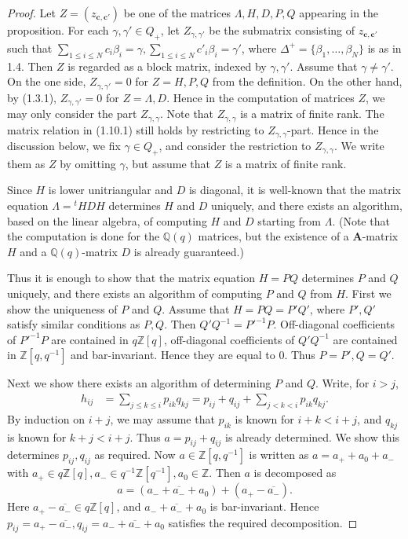 \documentclass[12pt]{amsart}
\renewcommand\b{\beta}
\newcommand\g{\gamma}
\newcommand\vD{\varDelta}
\newcommand\vL{\varLambda}
\renewcommand{\1}{\mathbb 1}
\newcommand{\QQ}{\mathbb Q}
\newcommand{\ZZ}{\mathbb Z}
\newcommand\BA{\mathbf A}
\newcommand\Bc{\mathbf c}
\newcommand\iv{^{-1}}
\newcommand\ol{\overline}
\numberwithin{equation}{section}
\begin{document}
\begin{proof}
Let $Z = (z_{\Bc,\Bc'})$ be one of the matrices $\vL, H, D, P, Q$
appearing in the proposition. For each $\g, \g' \in Q_+$,  let $Z_{\g, \g'}$
be the submatrix consisting of $z_{\Bc,\Bc'}$ such that
$\sum_{1 \le i \le N}c_i\b_i = \g, \sum_{1 \le i \le N}c'_i\b_i = \g'$,
where $\vD^+ = \{ \b_1, \dots, \b_N\}$ is as in 1.4. Then $Z$ is regarded as a block
matrix, indexed by $\g, \g'$.  Assume that $\g \ne \g'$.
On the one side, $Z_{\g,\g'} = 0$ for $Z = H, P, Q$ from the definition.
On the other hand, by (1.3.1), $Z_{\g, \g'} = 0$ for $Z = \vL, D$.
Hence in the computation of matrices $Z$, we may only consider the part $Z_{\g,\g}$. 
Note that $Z_{\g,\g}$ is a matrix of finite rank.
The matrix relation in (1.10.1) still holds by restricting to $Z_{\g,\g}$-part.
Hence in the discussion below, we fix $\g \in Q_+$, and consider the restriction
to $Z_{\g, \g}$.  We write them as $Z$ by omitting $\g$,
but assume that $Z$ is a matrix of finite rank. 
\par
Since $H$ is lower unitriangular and $D$ is diagonal, it is well-known that
the matrix equation $\vL = {}^tHDH$ determines $H$ and $D$ uniquely, and
there exists an algorithm,  based on the linear algebra,
of computing $H$ and $D$ starting from $\vL$. (Note that the computation is done
for the $\QQ(q)$ matrices, but the existence of a $\BA$-matrix $H$ and a $\QQ(q)$-matrix
$D$ is already guaranteed.)
\par
Thus it is enough to show that the matrix equation $H = PQ$ 
determines $P$ and $Q$ uniquely, and there exists an algorithm of computing
$P$ and $Q$ from $H$.
First we show the uniqueness of $P$ and $Q$.  Assume that
$H = PQ = P'Q'$, where $P',Q'$ satisfy similar conditions as $P,Q$.
Then $Q'Q\iv = {P'}\iv P$.
Off-diagonal coefficients of ${P'}\iv P$ are contained in $q\ZZ[q]$,
off-diagonal coefficients
of $Q'Q\iv $ are contained in $\ZZ[q,q\iv]$ and bar-invariant.  Hence they
are equal to 0.  Thus $P = P', Q = Q'$.
\par
Next we show there exists an algorithm of determining $P$ and $Q$.
Write, for $i > j$, 
\begin{align*}
  h_{ij} &= \sum_{j \le k \le i}p_{ik}q_{kj} = p_{ij} + q_{ij} + \sum_{j < k < i} p_{ik}q_{kj}.
\end{align*}
By induction on $i+j$, we may assume that $p_{ik}$ is known for $i+k < i+j$,
and $q_{kj}$ is known for $k + j < i+j$. Thus $a =  p_{ij} + q_{ij}$ is already determined.
We show this determines $p_{ij}, q_{ij}$ as required. 
Now $a \in \ZZ[q,q\iv]$ is written as $a = a_+ + a_0 + a_-$ with
$a_+ \in q\ZZ[q], a_- \in q\iv\ZZ[q\iv], a_0 \in \ZZ$.
Then $a$ is decomposed as 
\begin{equation*}
a = (a_- + \ol{a_-} + a_0) + (a_+ - \ol{a_-}). 
\end{equation*}
Here $a_+ - \ol{a_-} \in q\ZZ[q]$, and $a_- + \ol{a_-} + a_0$ is bar-invariant.
Hence $p_{ij} = a_+ - \ol{a_-}, q_{ij} = a_- + \ol{a_-} + a_0$ satisfies
the required decomposition. 
\end{proof}  
\end{document}
